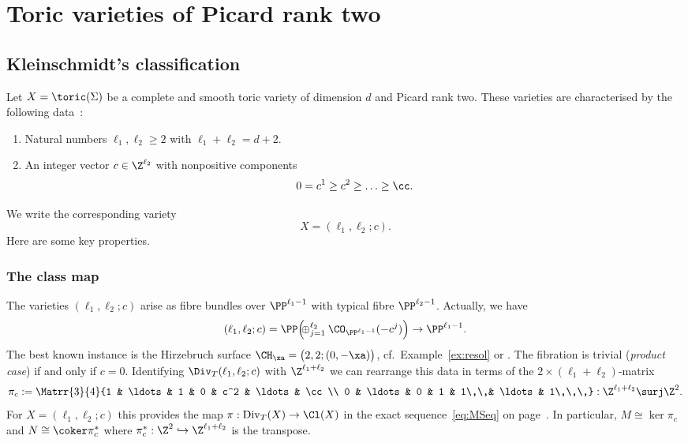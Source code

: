 \section{Toric varieties of Picard rank two}
\label{sec:TVPic2}
\subsection{Kleinschmidt's classification}
\label{pic2:KleinSchmidt}
Let $X=\toric(\Sigma)$ be a complete and smooth 
toric variety of dimension $d$ and Picard rank 
two. These 
varieties are characterised by the following 
data~\cite{kle88}:

\begin{enumerate}
\item[(i)]
Natural numbers $\ell_1,\ell_2\geq 2$ 
with $\ell_1+\ell_2=d+2$.
\vspace{2ex}
\item[(ii)]
An integer vector $c\in\Z^{\ell_2}$ with 
nonpositive components 
$$
0=c^1\geq c^2\geq\ldots\geq \cc.
$$
\end{enumerate}
We write the corresponding variety 
$$
{X=(\ell_1,\ell_2;c).}
$$
Here are some key properties.

\subsubsection{The class map}
\label{pic2:classMap}
The varieties $(\ell_1,\ell_2;c)$ arise as 
fibre bundles over $\PP^{\ell_1-1}$ with 
typical fibre $\PP^{\ell_2-1}$. 
{Actually, we have
$$
(\ell_1,\ell_2;c)=\PP\Big(\hspace{-0.5em}
\oplus_{j=1}^{\ell_2}\CO_{\PP^{\ell_1-1}}(-c^j)\Big) \to\PP^{\ell_1-1}.
$$
The best known instance is the Hirzebruch surface
$\CH_{\xa}=\big(2,2;(0,-\xa)\big)$, cf.~Example~\ref{ex:resol}
or .}
The fibration 
is trivial ({\em product case}) if and only if 
$c=0$. Identifying $\Div_T(\ell_1,\ell_2;c)$ 
with $\Z^{\ell_1+\ell_2}$ we can rearrange 
this data in terms of the $2\times(\ell_1 + \ell_2)$-matrix
$$
\pi_c:=\Matrr{3}{4}{1 & \ldots & 1 & 0 & c^2 & \ldots & \cc\\
0  & \ldots & 0 & 1 & 1\,\,& \ldots & 1\,\,\,}:\Z^{\ell_1+\ell_2}\surj\Z^2.
$$
For $X=(\ell_1,\ell_2;c)$ this provides the map 
$\pi:\mathrm{Div}_T(X)\to\Cl(X)$ in the exact 
sequence~\eqref{eq:MSeq} on page~\pageref{eq:MSeq}. 
In particular, $M\cong\ker\pi_c$ and 
$N\cong\coker\pi^\ast_c$ where 
$\pi^\ast_c:\Z^2\hookrightarrow\Z^{\ell_1+\ell_2}$ 
is the transpose. 

